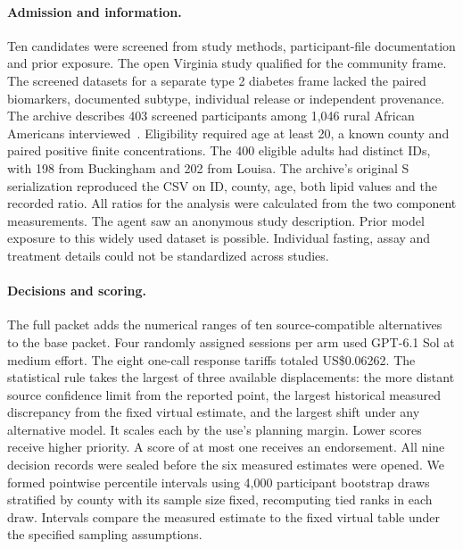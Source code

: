 \paragraph{Admission and information.}
Ten candidates were screened from study methods, participant-file documentation and prior exposure. The open Virginia study qualified for the community frame. The screened datasets for a separate type 2 diabetes frame lacked the paired biomarkers, documented subtype, individual release or independent provenance. The archive describes 403 screened participants among 1,046 rural African Americans interviewed~\cite{virginiadata,virginiastudy}. Eligibility required age at least 20, a known county and paired positive finite concentrations. The 400 eligible adults had distinct IDs, with 198 from Buckingham and 202 from Louisa. The archive's original S serialization reproduced the CSV on ID, county, age, both lipid values and the recorded ratio. All ratios for the analysis were calculated from the two component measurements. The agent saw an anonymous study description. Prior model exposure to this widely used dataset is possible. Individual fasting, assay and treatment details could not be standardized across studies.

\paragraph{Decisions and scoring.}
The full packet adds the numerical ranges of ten source-compatible alternatives to the base packet. Four randomly assigned sessions per arm used GPT-6.1 Sol at medium effort. The eight one-call response tariffs totaled US\$0.06262. The statistical rule takes the largest of three available displacements: the more distant source confidence limit from the reported point, the largest historical measured discrepancy from the fixed virtual estimate, and the largest shift under any alternative model. It scales each by the use's planning margin. Lower scores receive higher priority. A score of at most one receives an endorsement. All nine decision records were sealed before the six measured estimates were opened. We formed pointwise percentile intervals using 4,000 participant bootstrap draws stratified by county with its sample size fixed, recomputing tied ranks in each draw. Intervals compare the measured estimate to the fixed virtual table under the specified sampling assumptions.

